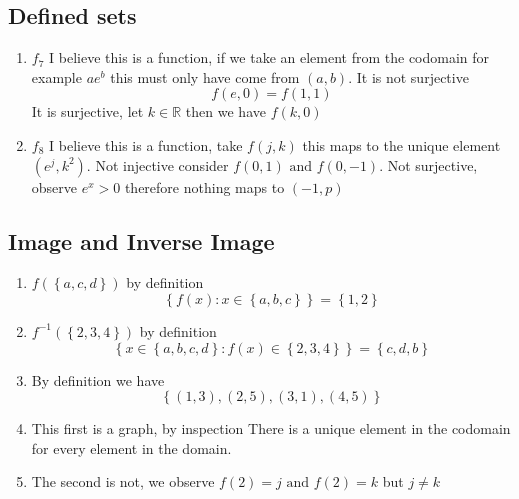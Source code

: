 \documentclass[11pt]{book}
\begin{document}

\subsection{Defined sets}%
\label{sub:defined_sets}

\begin{enumerate}
    \item $f_{7} $ I believe this is a function, if we take an element from the codomain for example $a e^{b} $ this must only have come from $\left( a,b \right) $.  It is not surjective 
        \[
        f\left(e,0\right) = f\left(1,1\right) 
        \]
        It is surjective, let $k\in \mathbb{R} $ then we have $f\left(k,0\right) $ 
    \item $f_{8} $ I believe this is a function, take $f\left(j,k\right) $ this maps to the unique element $(e^{j}, k^2) $. Not injective consider $f\left(0, 1\right) \text{ and } f\left(0, -1\right) $. Not surjective, observe $e^{x} > 0$ therefore nothing maps to $\left( -1, p \right) $ 
\end{enumerate}


\subsection{Image and Inverse Image}%
\label{sub:image_and_inverse_image}

\begin{enumerate}
    \item $f\left(\left\{ a,c,d \right\} \right) $ by definition
        \[
        \left\{ f\left(x\right) : x\in \left\{ a,b,c \right\}  \right\} = \left\{ 1,2 \right\} 
        \]
    \item $f^{-1} \left(\left\{ 2,3,4 \right\} \right) $ by definition 
        \[
        \left\{ x\in \left\{ a,b,c,d \right\} :f\left(x\right) \in \left\{ 2,3,4 \right\}  \right\} = \left\{ c,d,b \right\} 
        \]
    \item By definition we have 
        \[
            \left\{ \left( 1,3 \right) , \left( 2,5 \right) , \left( 3,1 \right) , \left( 4,5 \right)  \right\} 
        \]
    \item This first is a graph, by inspection There is a unique element in the codomain for every element in the domain.
    \item The second is not, we observe $f(2) = j \text{ and } f\left(2\right) = k $ but $j\neq k$  
\end{enumerate}
\end{document}
